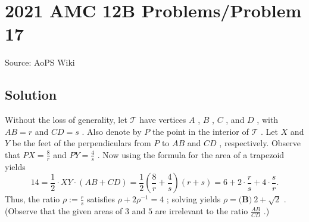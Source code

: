 \documentclass[12pt]{article}
\begin{document}
\section*{{2021 AMC 12B Problems/Problem 17}}
Source: AoPS Wiki

\subsection*{Solution}
Without the loss of generality, let $\mathcal T$ have vertices $A$ , $B$ , $C$ , and $D$ , with $AB = r$ and $CD = s$ . Also denote by $P$ the point in the interior of $\mathcal T$ . Let $X$ and $Y$ be the feet of the perpendiculars from $P$ to $AB$ and $CD$ , respectively. Observe that $PX = \tfrac 8r$ and $PY = \tfrac 4s$ . Now using the formula for the area of a trapezoid yields \[14 = \frac12\cdot XY\cdot (AB+CD) = \frac12\left(\frac 8r + \frac 4s\right)(r+s) = 6 + 2\cdot\frac rs + 4\cdot\frac sr.\] Thus, the ratio $\rho := \tfrac rs$ satisfies $\rho + 2\rho^{-1} = 4$ ; solving yields $\rho = \boxed{\textbf{(B)}\: 2+\sqrt{2}}$ . (Observe that the given areas of $3$ and $5$ are irrelevant to the ratio $\frac{AB}{CD}$ .)
\end{document}
